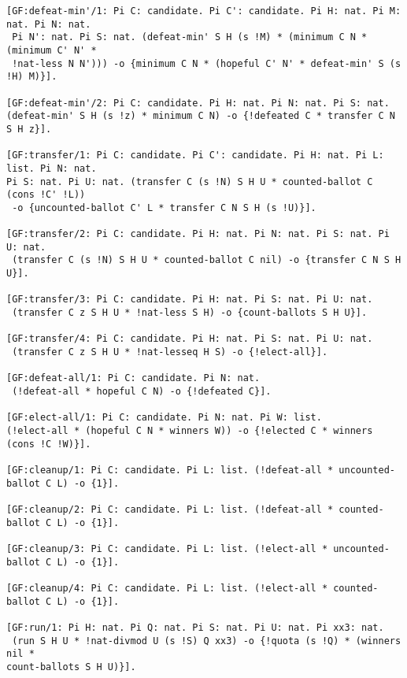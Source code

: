 \begin{lstlisting}[basicstyle=\footnotesize\ttfamily,numbers=none]
[GF:defeat-min'/1: Pi C: candidate. Pi C': candidate. Pi H: nat. Pi M: nat. Pi N: nat. 
 Pi N': nat. Pi S: nat. (defeat-min' S H (s !M) * (minimum C N * (minimum C' N' * 
 !nat-less N N'))) -o {minimum C N * (hopeful C' N' * defeat-min' S (s !H) M)}].

[GF:defeat-min'/2: Pi C: candidate. Pi H: nat. Pi N: nat. Pi S: nat.  
(defeat-min' S H (s !z) * minimum C N) -o {!defeated C * transfer C N S H z}].

[GF:transfer/1: Pi C: candidate. Pi C': candidate. Pi H: nat. Pi L: list. Pi N: nat.  
Pi S: nat. Pi U: nat. (transfer C (s !N) S H U * counted-ballot C (cons !C' !L)) 
 -o {uncounted-ballot C' L * transfer C N S H (s !U)}].

[GF:transfer/2: Pi C: candidate. Pi H: nat. Pi N: nat. Pi S: nat. Pi U: nat. 
 (transfer C (s !N) S H U * counted-ballot C nil) -o {transfer C N S H U}].

[GF:transfer/3: Pi C: candidate. Pi H: nat. Pi S: nat. Pi U: nat. 
 (transfer C z S H U * !nat-less S H) -o {count-ballots S H U}].

[GF:transfer/4: Pi C: candidate. Pi H: nat. Pi S: nat. Pi U: nat. 
 (transfer C z S H U * !nat-lesseq H S) -o {!elect-all}].

[GF:defeat-all/1: Pi C: candidate. Pi N: nat. 
 (!defeat-all * hopeful C N) -o {!defeated C}].

[GF:elect-all/1: Pi C: candidate. Pi N: nat. Pi W: list.  
(!elect-all * (hopeful C N * winners W)) -o {!elected C * winners (cons !C !W)}].

[GF:cleanup/1: Pi C: candidate. Pi L: list. (!defeat-all * uncounted-ballot C L) -o {1}].

[GF:cleanup/2: Pi C: candidate. Pi L: list. (!defeat-all * counted-ballot C L) -o {1}].

[GF:cleanup/3: Pi C: candidate. Pi L: list. (!elect-all * uncounted-ballot C L) -o {1}].

[GF:cleanup/4: Pi C: candidate. Pi L: list. (!elect-all * counted-ballot C L) -o {1}].

[GF:run/1: Pi H: nat. Pi Q: nat. Pi S: nat. Pi U: nat. Pi xx3: nat. 
 (run S H U * !nat-divmod U (s !S) Q xx3) -o {!quota (s !Q) * (winners nil *  
count-ballots S H U)}].
\end{lstlisting}